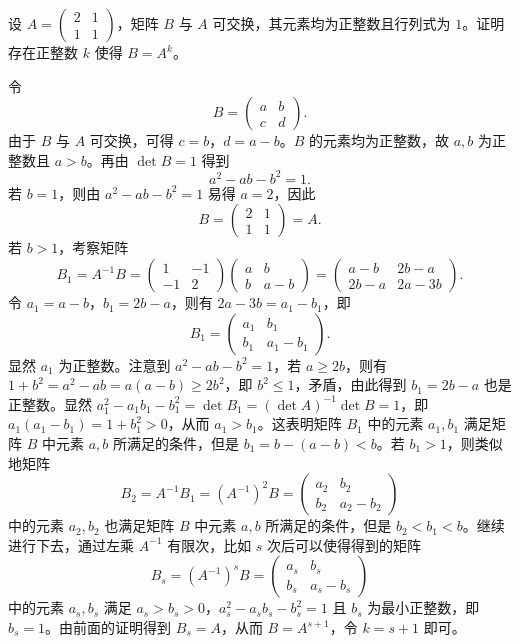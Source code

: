 设 $A=\begin{pmatrix}2&1\\1&1\end{pmatrix}$，矩阵 $B$ 与 $A$ 可交换，其元素均为正整数且行列式为 $1$。证明存在正整数 $k$ 使得 $B=A^k$。
\begin{solution}
令
\[
B=\begin{pmatrix}a&b\\c&d\end{pmatrix}.
\]
由于 $B$ 与 $A$ 可交换，可得 $c=b$，$d=a-b$。$B$ 的元素均为正整数，故 $a,b$ 为正整数且 $a>b$。再由 $\det B=1$ 得到
\[
a^2-ab-b^2=1.
\]
若 $b=1$，则由 $a^2-ab-b^2=1$ 易得 $a=2$，因此
\[
B=\begin{pmatrix}2&1\\1&1\end{pmatrix}=A.
\]
若 $b>1$，考察矩阵
\[
B_1=A^{-1}B=\begin{pmatrix}1&-1\\-1&2\end{pmatrix}\begin{pmatrix}a&b\\b&a-b\end{pmatrix}
=\begin{pmatrix}a-b&2b-a\\2b-a&2a-3b\end{pmatrix}.
\]
令 $a_1=a-b$，$b_1=2b-a$，则有 $2a-3b=a_1-b_1$，即
\[
B_1=\begin{pmatrix}a_1&b_1\\b_1&a_1-b_1\end{pmatrix}.
\]
显然 $a_1$ 为正整数。注意到 $a^2-ab-b^2=1$，若 $a\ge2b$，则有 $1+b^2=a^2-ab=a(a-b)\ge2b^2$，即 $b^2\le1$，矛盾，由此得到 $b_1=2b-a$ 也是正整数。显然 $a_1^2-a_1b_1-b_1^2=\det B_1=(\det A)^{-1}\det B=1$，即 $a_1(a_1-b_1)=1+b_1^2>0$，从而 $a_1>b_1$。这表明矩阵 $B_1$ 中的元素 $a_1,b_1$ 满足矩阵 $B$ 中元素 $a,b$ 所满足的条件，但是 $b_1=b-(a-b)<b$。若 $b_1>1$，则类似地矩阵
\[
B_2=A^{-1}B_1=(A^{-1})^2B=\begin{pmatrix}a_2&b_2\\b_2&a_2-b_2\end{pmatrix}
\]
中的元素 $a_2,b_2$ 也满足矩阵 $B$ 中元素 $a,b$ 所满足的条件，但是 $b_2<b_1<b$。继续进行下去，通过左乘 $A^{-1}$ 有限次，比如 $s$ 次后可以使得得到的矩阵
\[
B_s=(A^{-1})^sB=\begin{pmatrix}a_s&b_s\\b_s&a_s-b_s\end{pmatrix}
\]
中的元素 $a_s,b_s$ 满足 $a_s>b_s>0$，$a_s^2-a_sb_s-b_s^2=1$ 且 $b_s$ 为最小正整数，即 $b_s=1$。由前面的证明得到 $B_s=A$，从而 $B=A^{s+1}$，令 $k=s+1$ 即可。
\end{solution}

